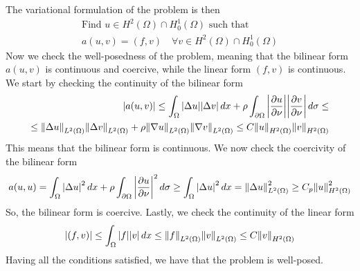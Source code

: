 The variational formulation of the problem is then
\[
    \begin{split}
        \text{Find } u \in H^2(\Omega) \cap H^1_0(\Omega) \text{ such that } \\
        a(u, v) = (f, v) \quad \forall v \in H^2(\Omega) \cap H^1_0(\Omega)
    \end{split}
\]
Now we check the well-posedness of the problem, meaning that the bilinear form
\(a(u, v)\) is continuous and coercive, while the linear form \((f, v)\) is
continuous. We start by checking the continuity of the bilinear form
\[
    \begin{split}
        \abs{a(u, v)} \leq \int_\Omega \abs{\Delta u} \abs{\Delta v} \, dx + \rho \int_{\partial \Omega} \abs{\frac{\partial u}{\partial \nu}} \abs{\frac{\partial v}{\partial \nu}} \, d\sigma \leq \\
        \leq \norm{\Delta u}_{L^2(\Omega)} \norm{\Delta v}_{L^2(\Omega)} + \rho \norm{\nabla u}_{L^2(\Omega)} \norm{\nabla v}_{L^2(\Omega)} \leq C \norm{u}_{H^2(\Omega)} \norm{v}_{H^2(\Omega)}
    \end{split}
\]
This means that the bilinear form is continuous. We now check the coercivity of
the bilinear form
\[
    \begin{split}
        a(u, u) = \int_\Omega \abs{\Delta u}^2 \, dx + \rho \int_{\partial \Omega} \abs{\frac{\partial u}{\partial \nu}}^2 \, d\sigma \geq \int_\Omega \abs{\Delta u}^2 \, dx = \norm{\Delta u}_{L^2(\Omega)}^2 \geq C_p \norm{u}_{H^2(\Omega)}^2
    \end{split}
\]
So, the bilinear form is coercive. Lastly, we check the continuity of the
linear form
\[
    \begin{split}
        \abs{(f, v)} \leq \int_\Omega \abs{f} \abs{v} \, dx \leq \norm{f}_{L^2(\Omega)} \norm{v}_{L^2(\Omega)} \leq C \norm{v}_{H^2(\Omega)}
    \end{split}
\]
Having all the conditions satisfied, we have that the problem is well-posed.

\newpage
